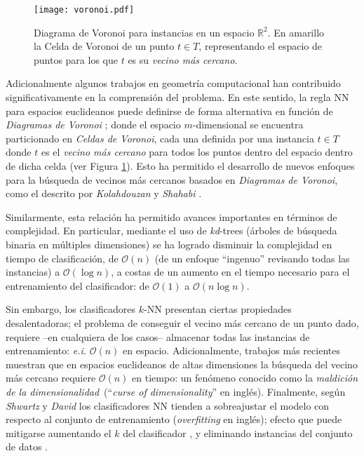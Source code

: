 \begin{figure}[h!]
\centering
\texttt{[image: voronoi.pdf]}
\caption[Diagramas de Voronoi y NN]{Diagrama de Voronoi para instancias en un espacio $\mathbb{R}^2$. En amarillo la Celda de Voronoi de un punto $t \in T$, representando el espacio de puntos para los que $t$ es su \emph{vecino más cercano}.}
\label{voronoi}
\end{figure}

Adicionalmente algunos trabajos en geometría computacional han contribuido significativamente en la comprensión del problema. En este sentido, la regla NN para espacios euclideanos puede definirse de forma alternativa en función de \emph{Diagramas de Voronoi} \cite{voronoi1908nouvelles}; donde el espacio $m$-dimensional se encuentra particionado en \emph{Celdas de Voronoi}, cada una definida por una instancia $t \in T$ donde $t$ es el \emph{vecino más cercano} para todos los puntos dentro del espacio dentro de dicha celda (ver Figura \ref{voronoi}). Esto ha permitido el desarrollo de nuevos enfoques para la búsqueda de vecinos más cercanos basados en \emph{Diagramas de Voronoi}, como el descrito por \emph{Kolahdouzan} y \emph{Shahabi} \cite{Kolahdouzan:2004:VKN:1316689.1316762}.

Similarmente, esta relación ha permitido avances importantes en términos de complejidad. En particular, mediante el uso de \emph{kd}-trees \cite{Bentley:1975:MBS:361002.361007} (árboles de búsqueda binaria en múltiples dimensiones) se ha logrado disminuir la complejidad en tiempo de clasificación, de $\mathcal{O}(n)$ (de un enfoque ``ingenuo'' revisando todas las instancias) a $\mathcal{O}(\log{n})$, a costas de un aumento en el tiempo necesario para el entrenamiento del clasificador: de $\mathcal{O}(1)$ a $\mathcal{O}(n\log{n})$.

Sin embargo, los clasificadores $k$-NN presentan ciertas propiedades desalentadoras; el problema de conseguir el vecino más cercano de un punto dado, requiere --en cualquiera de los casos-- almacenar todas las instancias de entrenamiento: \emph{e.i.} $\mathcal{O}(n)$ en espacio. Adicionalmente, trabajos más recientes \cite{DBLP:conf/soda/KrauthgamerL04} muestran que en espacios euclideanos de altas dimensiones la búsqueda del vecino más cercano requiere $\mathcal{O}(n)$ en tiempo: un fenómeno conocido como la \guillemotleft\emph{maldición de la dimensionalidad}\guillemotright\ (``\emph{curse of dimensionality}'' en inglés). Finalmente, según \emph{Shwartz} y \emph{David} \cite{shalev2014understanding} los clasificadores NN tienden a sobreajustar el modelo con respecto al conjunto de entrenamiento (\emph{overfitting} en inglés); efecto que puede mitigarse aumentando el $k$ del clasificador \cite{devroye1994strong, shalev2014understanding}, y eliminando instancias del conjunto de datos \cite{DBLP:journals/corr/GottliebKK13}.

